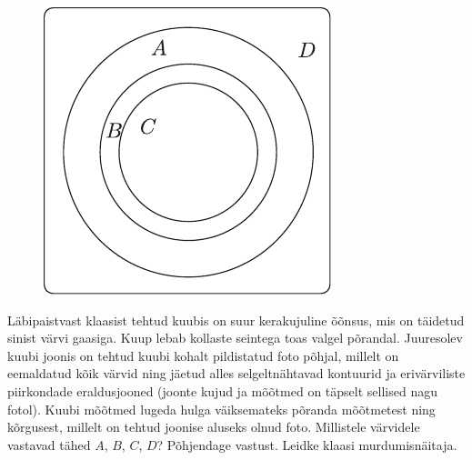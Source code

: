 \documentclass[10pt, twoside]{article}
\begin{document}
{%

\begin{figure}
	\begin{center}
		\vspace{-20pt}
		\includegraphics[width=0.95\linewidth]{2007-v3g-08-yl}
	\end{center}
\end{figure}
Läbipaistvast klaasist tehtud kuubis on suur kerakujuline õõnsus, mis on täidetud sinist värvi gaasiga. Kuup lebab kollaste seintega toas valgel põrandal. Juuresolev kuubi joonis on tehtud kuubi kohalt pildistatud foto põhjal, millelt on eemaldatud kõik värvid ning jäetud alles selgeltnähtavad kontuurid ja erivärviliste piirkondade eraldusjooned (joonte kujud ja mõõtmed on täpselt sellised nagu fotol). Kuubi mõõtmed lugeda hulga väiksemateks põranda mõõtmetest ning kõrgusest, millelt on tehtud joonise aluseks olnud foto. Millistele värvidele vastavad tähed $A$, $B$, $C$, $D$? Põhjendage vastust. Leidke klaasi murdumisnäitaja.
\probend
\newpage

\bigskip


}
\end{document}
